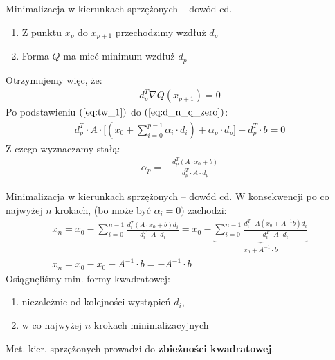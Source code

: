   \begin{frame}{Minimalizacja w kierunkach sprzężonych -- dowód cd.}
    \begin{enumerate}
      \item Z punktu $x_p$ do $x_{p + 1}$ przechodzimy wzdłuż $d_p$
      \item Forma $Q$ ma mieć minimum wzdłuż $d_p$
    \end{enumerate}
    Otrzymujemy więc, że:
    \begin{equation}\label{eq:d_n_q_zero}
        \begin{aligned}
          d_p^T \nabla Q(x_{p + 1}) = 0
        \end{aligned}
    \end{equation}
    Po podstawieniu $(\ref{eq:tw_1})$ do $(\ref{eq:d_n_q_zero})$:
    \begin{equation*}
        \begin{aligned}
          d_p^T \cdot A \cdot \bigg[(x_0 + \sum_{i = 0}^{p - 1} \alpha_i \cdot d_i) + \alpha_p \cdot d_p \bigg] + d_p^T \cdot b = 0
        \end{aligned}
    \end{equation*}
    Z czego wyznaczamy stałą:
    \begin{equation*}
        \begin{aligned}
          \alpha_p = - \frac{d_p^T (A \cdot x_0 + b)}{d_p^T \cdot A \cdot d_p}
        \end{aligned}
    \end{equation*}
  \end{frame}

  \begin{frame}{Minimalizacja w kierunkach sprzężonych -- dowód cd.}
    W konsekwencji po co najwyżej $n$ krokach, (bo może być $\alpha_i = 0)$ zachodzi:
    \begin{equation*}
        \begin{aligned}
          x_n = x_0 - \sum_{i = 0}^{n - 1} \frac{d_i^T (A \cdot x_0 + b) d_i}{d_i^T \cdot A \cdot d_i} =
          x_0 - \underbrace{\sum_{i = 0}^{n - 1} \frac{d_i^T \cdot A (x_0 + A^{-1} b) d_i}{d_i^T \cdot A \cdot d_i}}_{x_0 + A^{-1} \cdot b}\\
          x_n = x_0 - x_0 - A^{-1} \cdot b = - A^{-1} \cdot b
        \end{aligned}
    \end{equation*}
    Osiągnęliśmy min. formy kwadratowej:
    \begin{enumerate}
      \item niezależnie od kolejności wystąpień $d_i$,
      \item w co najwyżej $n$ krokach minimalizacyjnych
    \end{enumerate}
    Met. kier. sprzężonych prowadzi do \textbf{zbieżności kwadratowej}.
  \end{frame}
